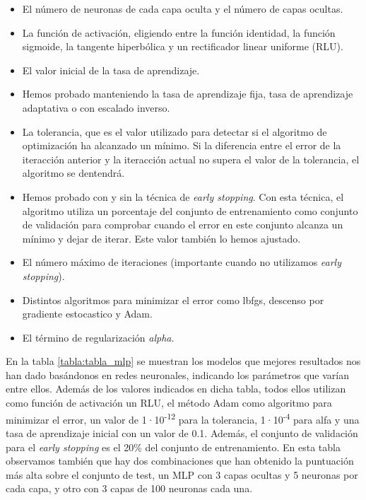 \documentclass[journal,twoside]{JoPhA}
\begin{document}
\begin{itemize}
	\item El número de neuronas de cada capa oculta y el número de capas ocultas.  \\
	\item La función de activación, eligiendo entre la función identidad, la función sigmoide, la tangente hiperbólica y un rectificador linear uniforme (RLU). \\
	\item El valor inicial de la tasa de aprendizaje.  \\
	\item Hemos probado manteniendo la tasa de aprendizaje fija, tasa de aprendizaje adaptativa o con escalado inverso.  \\
	\item La tolerancia, que es el valor utilizado para detectar si el algoritmo de optimización ha alcanzado un mínimo. Si la diferencia entre el error de la iteracción anterior y la iteracción actual no supera el valor de la tolerancia, el algoritmo se dentendrá.  \\
	\item Hemos probado con y sin la técnica de \textit{early stopping}. Con esta técnica, el algoritmo utiliza un porcentaje del conjunto de entrenamiento como conjunto de validación para comprobar cuando el error en este conjunto alcanza un mínimo y dejar de iterar. Este valor también lo hemos ajustado.   \\
	\item El número máximo de iteraciones (importante cuando no utilizamos \textit{early stopping}).  \\
	\item Distintos algoritmos para minimizar el error como lbfgs, descenso por gradiente estocastico y Adam.  \\
	\item El término de regularización \textit{alpha}.  \\
\end{itemize}

En la tabla \ref{tabla:tabla_mlp} se muestran los modelos que mejores resultados nos han dado basándonos en redes neuronales, indicando los parámetros que varían entre ellos. Además de los valores indicados en dicha tabla, todos ellos utilizan como función de activación un RLU, el método Adam como algoritmo para minimizar el error, un valor de 1·10\textsuperscript{-12} para la tolerancia, 1·10\textsuperscript{-4} para alfa y una tasa de aprendizaje inicial con un valor de 0.1. Además, el conjunto de validación para el \textit{early stopping} es el 20\% del conjunto de entrenamiento. En esta tabla observamos también que hay dos combinaciones que han obtenido la puntuación más alta sobre el conjunto de test, un MLP con 3 capas ocultas y 5 neuronas por cada capa, y otro con 3 capas de 100 neuronas cada una.
\end{document}
